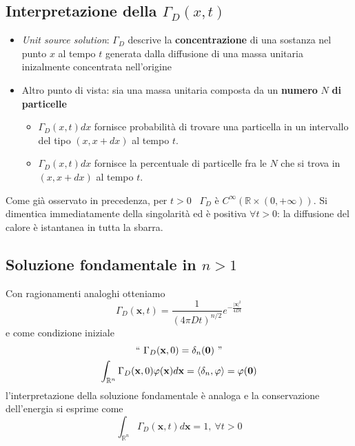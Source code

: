 \documentclass[10pt,a4paper,twoside,openright]{book}
\newcommand{\x}{\mathbf{x}}
\newcommand{\zer}{\mathbf{0}}
\begin{document}
\subsection{Interpretazione della \texorpdfstring{$\displaystyle \Gamma _{D}(x,t)$}{soluzione}}
\begin{itemize}
\item \textit{Unit source solution}: $\displaystyle \Gamma _{D}$ descrive la \textbf{concentrazione} di una sostanza nel punto $\displaystyle x$ al tempo $\displaystyle t$ generata dalla diffusione di una massa unitaria inizalmente concentrata nell'origine
\item Altro punto di vista: sia una massa unitaria composta da un \textbf{numero }$\displaystyle N$\textbf{ di particelle}
\begin{itemize}
\item $\displaystyle \Gamma _{D}(x,t) dx$ fornisce probabilità di trovare una particella in un intervallo del tipo $\displaystyle (x,x+dx)$ al tempo $\displaystyle t$.
\item $\displaystyle \Gamma _{D}(x,t) dx$ fornisce la percentuale di particelle fra le $\displaystyle N$ che si trova in $\displaystyle (x,x+dx)$ al tempo $\displaystyle t$.
\end{itemize}
\end{itemize}
\begin{nb}
Come già osservato in precedenza, per $\displaystyle t >0$ \ $\displaystyle \Gamma _{D}$ è $\displaystyle C^{\infty }(\mathbb{R} \times (0,+\infty))$. Si dimentica immediatamente della singolarità ed è positiva $\displaystyle \forall t >0$: la diffusione del calore è istantanea in tutta la sbarra.
\end{nb}
\subsection{Soluzione fondamentale in \texorpdfstring{$n>1$}{n>1}}

Con ragionamenti analoghi otteniamo
\begin{equation*}
\Gamma _{D}(\x,t) =\frac{1}{(4\pi Dt)^{n/2}} e^{-\frac{| \x| ^{2}}{4Dt}}
\end{equation*}
e come condizione iniziale
\begin{gather*}
``\ \Gamma _{D}(\x,0) =\delta _{n}(\zer) \ "\\
\int _{\mathbb{R}^{n}} \Gamma _{D}(\x,0) \varphi (\x) d\x =\langle \delta _{n},\varphi \rangle =\varphi (\zer)
\end{gather*}
l'interpretazione della soluzione fondamentale è analoga e la conservazione dell'energia si esprime come\begin{equation*}
\int _{\mathbb{R}^{n}} \Gamma _{D}(\x,t) d\x =1,\ \forall t >0
\end{equation*}
\end{document}
